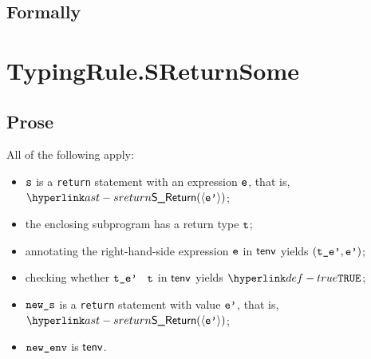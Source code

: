 

\subsection{Formally}


\section{TypingRule.SReturnSome \label{sec:TypingRule.SReturnSome}}

\subsection{Prose}
All of the following apply:
\begin{itemize}
  \item $\texttt{s}$ is a \texttt{return} statement with an expression $\texttt{e}$, that is, $\SReturn(\langle \vep \rangle)$;
  \item the enclosing subprogram has a return type $\texttt{t}$;
  \item annotating the right-hand-side expression $\texttt{e}$ in $\textsf{tenv}$ yields $(\texttt{t\_e'},\texttt{e'})$\ProseOrTypeError;
  \item checking whether $\texttt{t\_e'}$ \typesatisfies\ $\texttt{t}$ in $\textsf{tenv}$ yields $\True$\ProseOrTypeError;
  \item $\texttt{new\_s}$ is a \texttt{return} statement with value $\texttt{e'}$, that is, $\SReturn(\langle \vep \rangle)$;
  \item $\texttt{new\_env}$ is $\textsf{tenv}$.
\end{itemize}

